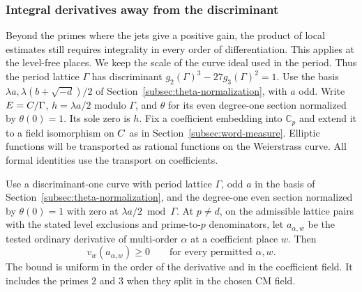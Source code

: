 \subsubsection{Integral derivatives away from the discriminant}
\label{subsec:baseline-jets}
\hypertarget{source-baseline-jets}{}

Beyond the primes where the jets give a positive gain, the product of local estimates still requires integrality in every order of differentiation. This applies at the level-free places. We keep the
scale of the curve ideal used in the period. Thus the period
lattice \(\Gamma\) has discriminant
\(g_2(\Gamma)^3-27g_3(\Gamma)^2=1\). Use the basis
\(\lambda a,\lambda(b+\sqrt{-d})/2\) of
Section~\ref{subsec:theta-normalization}, with \(a\) odd.
Write \(E=C/\Gamma\), \(h=\lambda a/2\) modulo \(\Gamma\),
and \(\theta\) for its even degree-one section normalized by
\(\theta(0)=1\). Its sole zero is \(h\).
Fix a coefficient embedding into \(\mathbb C_p\) and extend it
to a field isomorphism on \(C\) as in
Section~\ref{subsec:word-measure}. Elliptic functions will
be transported as rational functions on the Weierstrass curve.
All formal identities use the transport on coefficients.

\begin{proposition}\label{prop:level-free-theta-jets}
Use a discriminant-one curve with period lattice \(\Gamma\),
odd \(a\) in the basis of Section~\ref{subsec:theta-normalization},
and the degree-one even section normalized by \(\theta(0)=1\)
with zero at \(\lambda a/2\bmod\Gamma\).
At \(p\ne d\), on the admissible lattice pairs with the
stated level exclusions and prime-to-\(p\) denominators,
let \(a_{\alpha,w}\) be the tested ordinary derivative of multi-order \(\alpha\) at a coefficient place \(w\). Then
\[
 v_w(a_{\alpha,w})\ge0\qquad\text{for every permitted }\alpha,w.
\]
 The bound is uniform in the order of
the derivative and in the coefficient field. It includes
the primes \(2\) and \(3\) when they split in the chosen CM field.
\end{proposition}

